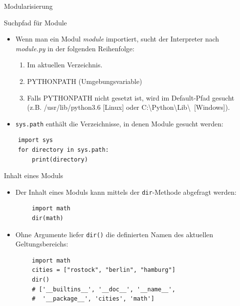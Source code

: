 \documentclass[utf8, smaller, c]{beamer}
\renewcommand{\tt}[1]{{\texttt{#1}}}
\begin{document}
\begin{frame}{Modularisierung}
	\pagebreak
		
	\begin{block}{Suchpfad für Module}
		\begin{itemize}
			\item Wenn man ein Modul \textit{module} importiert, sucht der Interpreter nach \textit{module.py} in der 
			folgenden Reihenfolge:
				\begin{enumerate}
					\item Im aktuellen Verzeichnis.
					\item PYTHONPATH (Umgebungsvariable)
					\item Falls PYTHONPATH nicht gesetzt ist, wird im Default-Pfad gesucht (z.B. /usr/lib/python3.6
					[Linux] oder C:\textbackslash Python\textbackslash Lib\textbackslash\ [Windows]).
				\end{enumerate}
			\item \tt{sys.path} enthält die Verzeichnisse, in denen Module gesucht werden:
		\end{itemize}
		\begin{lstlisting}
	import sys
	for directory in sys.path:
		print(directory)
		\end{lstlisting}
	\end{block}
	
	\pagebreak
	
	\begin{block}{Inhalt eines Moduls}
		\begin{itemize}
			\item Der Inhalt eines Moduls kann mittels der \tt{dir}-Methode abgefragt werden:
		\end{itemize}
		\begin{lstlisting}
		import math
		dir(math)
		\end{lstlisting}
		\begin{itemize}
			\item Ohne Argumente liefer \tt{dir()} die definierten Namen des aktuellen Geltungsbereichs:
		\end{itemize}
		\begin{lstlisting}
		import math
		cities = ["rostock", "berlin", "hamburg"]
		dir()
		# ['__builtins__', '__doc__', '__name__',
		#  '__package__', 'cities', 'math']
		\end{lstlisting}
	\end{block}		
	

\end{frame}
\end{document}
